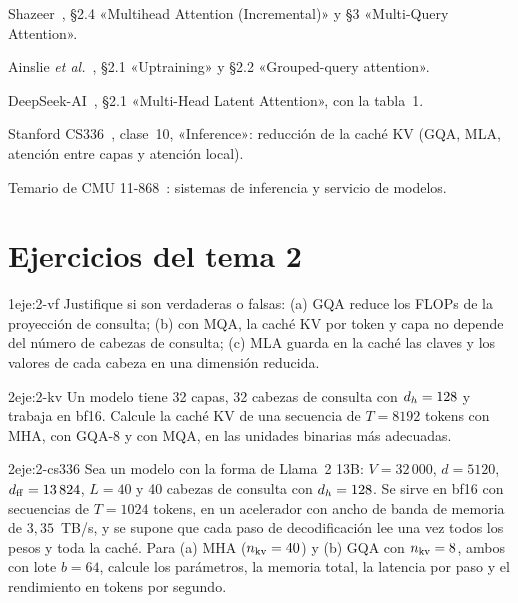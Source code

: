 \begin{lecturas}
\item Shazeer~\cite{mqa}, §2.4 «Multihead Attention (Incremental)» y §3 «Multi-Query Attention».
\item Ainslie \emph{et al.}~\cite{gqa}, §2.1 «Uptraining» y §2.2 «Grouped-query attention».
\item DeepSeek-AI~\cite{deepseekv2}, §2.1 «Multi-Head Latent Attention», con la tabla~1.
\item Stanford CS336~\cite{cs336}, clase~10, «Inference»: reducción de la caché KV (GQA, MLA, atención entre capas y atención local).
\item Temario de CMU 11-868~\cite{cmu11868}: sistemas de inferencia y servicio de modelos.
\end{lecturas}

\section*{Ejercicios del tema 2}

\begin{ejercicio}{1}{eje:2-vf}
Justifique si son verdaderas o falsas: (a) GQA reduce los FLOPs de la proyección de consulta; (b) con MQA, la caché KV por token y capa no depende del número de cabezas de consulta; (c) MLA guarda en la caché las claves y los valores de cada cabeza en una dimensión reducida.
\end{ejercicio}

\begin{ejercicio}{2}{eje:2-kv}
Un modelo tiene 32 capas, 32 cabezas de consulta con $d_{h}=128$ y trabaja en bf16. Calcule la caché KV de una secuencia de $T=8192$ tokens con MHA, con GQA-8 y con MQA, en las unidades binarias más adecuadas.
\end{ejercicio}

\begin{ejercicio}{2}{eje:2-cs336}
Sea un modelo con la forma de Llama~2 13B: $V=32\,000$, $d=5120$, $d_{\mathrm{ff}}=13\,824$, $L=40$ y 40 cabezas de consulta con $d_{h}=128$. Se sirve en bf16 con secuencias de $T=1024$ tokens, en un acelerador con ancho de banda de memoria de $3{,}35$~TB/s, y se supone que cada paso de decodificación lee una vez todos los pesos y toda la caché. Para (a) MHA ($n_{\mathrm{kv}}=40$) y (b) GQA con $n_{\mathrm{kv}}=8$, ambos con lote $b=64$, calcule los parámetros, la memoria total, la latencia por paso y el rendimiento en tokens por segundo.
\end{ejercicio}

